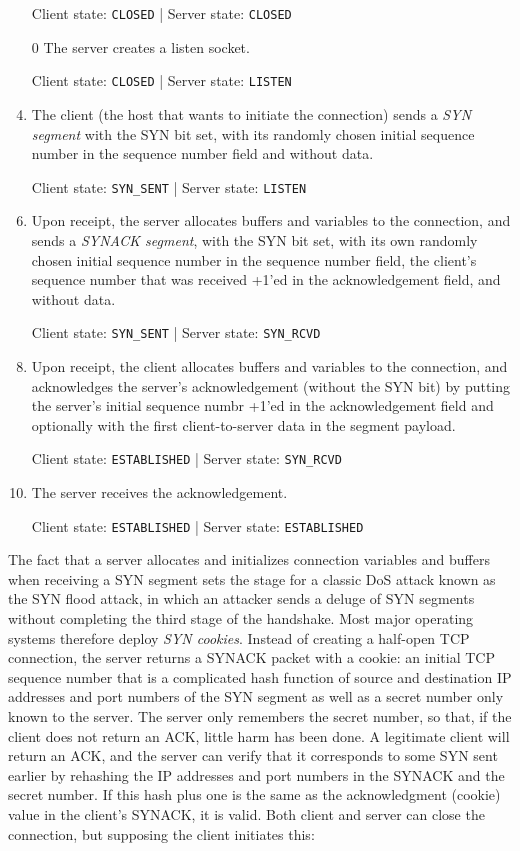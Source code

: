 \documentclass[8pt, table, xcdraw]{article}%
\begin{document}
\begin{enumerate}
    \item[\textbullet] Client state: \lstinline{CLOSED} | Server state: \lstinline{CLOSED}
    \item[0] The server creates a listen socket.
    \item[\textbullet] Client state: \lstinline{CLOSED} | Server state: \lstinline{LISTEN}
    \item The client (the host that wants to initiate the connection) sends a \emph{SYN segment} with the SYN bit set, with its randomly chosen initial sequence number in the sequence number field and without data.
    \item[\textbullet] Client state: \lstinline{SYN_SENT} | Server state: \lstinline{LISTEN}
    \item Upon receipt, the server allocates buffers and variables to the connection, and sends a \emph{SYNACK segment}, with the SYN bit set, with its own randomly chosen initial sequence number in the sequence number field, the client's sequence number that was received +1'ed in the acknowledgement field, and without data.
    \item[\textbullet] Client state: \lstinline{SYN_SENT} | Server state: \lstinline{SYN_RCVD}
    \item Upon receipt, the client allocates buffers and variables to the connection, and acknowledges the server's acknowledgement (without the SYN bit) by putting the server's initial sequence numbr +1'ed in the acknowledgement field and optionally with the first client-to-server data in the segment payload.
    \item[\textbullet] Client state: \lstinline{ESTABLISHED} | Server state: \lstinline{SYN_RCVD}
    \item The server receives the acknowledgement.
    \item[\textbullet] Client state: \lstinline{ESTABLISHED} | Server state: \lstinline{ESTABLISHED}
\end{enumerate}

The fact that a server allocates and initializes connection variables and buffers when receiving a SYN segment sets the stage for a classic DoS attack known as the SYN flood attack, in which an attacker sends a deluge of SYN segments without completing the third stage of the handshake. Most major operating systems therefore deploy \emph{SYN cookies}. Instead of creating a half-open TCP connection, the server returns a SYNACK packet with a cookie: an initial TCP sequence number that is a complicated hash function of source and destination IP addresses and port numbers of the SYN segment as well as a secret number only known to the server. The server only remembers the secret number, so that, if the client does not return an ACK, little harm has been done. A legitimate client will return an ACK, and the server can verify that it corresponds to some SYN sent earlier by rehashing the IP addresses and port numbers in the SYNACK and the secret number. If this hash plus one is the same as the acknowledgment (cookie) value in the client’s SYNACK, it is valid.
Both client and server can close the connection, but supposing the client initiates this:
\end{document}

